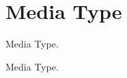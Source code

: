 \hypertarget{group__lavu__media}{}\section{Media Type}
\label{group__lavu__media}


Media Type.  


Media Type. 

